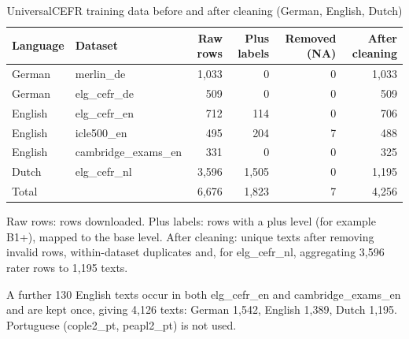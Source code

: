 \begin{table}[htbp]
\centering
\small
\begin{threeparttable}
\caption{UniversalCEFR training data before and after cleaning (German, English, Dutch)}
\label{tab:clf-data}
\begin{tabular}{llrrrr}
\hline
Language & Dataset & Raw rows & Plus labels & Removed (NA) & After cleaning \\
\hline
German & merlin\_de & 1,033 & 0 & 0 & 1,033 \\
German & elg\_cefr\_de & 509 & 0 & 0 & 509 \\
English & elg\_cefr\_en & 712 & 114 & 0 & 706 \\
English & icle500\_en & 495 & 204 & 7 & 488 \\
English & cambridge\_exams\_en & 331 & 0 & 0 & 325 \\
Dutch & elg\_cefr\_nl & 3,596 & 1,505 & 0 & 1,195 \\
\hline
Total &  & 6,676 & 1,823 & 7 & 4,256 \\
\hline
\end{tabular}
\begin{tablenotes}
\footnotesize
\item Raw rows: rows downloaded. Plus labels: rows with a plus level (for example B1+), mapped to the base level. After cleaning: unique texts after removing invalid rows, within-dataset duplicates and, for elg\_cefr\_nl, aggregating 3,596 rater rows to 1,195 texts.
\item A further 130 English texts occur in both elg\_cefr\_en and cambridge\_exams\_en and are kept once, giving 4,126 texts: German 1,542, English 1,389, Dutch 1,195. Portuguese (cople2\_pt, peapl2\_pt) is not used.
\end{tablenotes}
\end{threeparttable}
\end{table}
